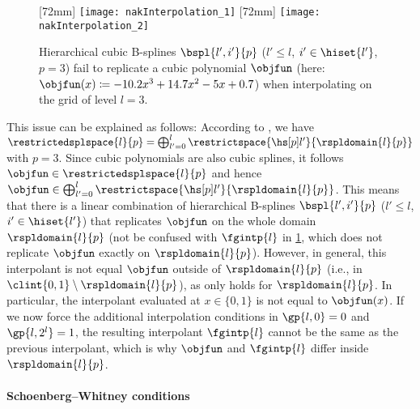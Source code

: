 \begin{figure}
  [72mm]{%
    \texttt{[image: nakInterpolation\_1]}%
  }%
  \hfill%
  [72mm]{%
    \texttt{[image: nakInterpolation\_2]}%
  }%
  \caption[%
    Issues when interpolating with uniform hierarchical B-splines%
  ]{%
    Hierarchical cubic B-splines $\bspl{l',i'}{p}$
    ($l' \le l$, $i' \in \hiset{l'}$, $p = 3$)
    fail to replicate a cubic polynomial $\objfun$
    (here: $\objfun(x) \ceq -10.2 x^3 + 14.7 x^2 - 5x + 0.7$)
    when interpolating on the grid of level $l = 3$.%
  }%
  \label{fig:nakInterpolation}%
\end{figure}

This issue can be explained as follows:
According to ,
we have $\restrictedsplspace{l}{p}
= \bigoplus_{l'=0}^l \restrictspace{\hsbspl{l'}{p}}{\rspldomain{l}{p}}$
with $p = 3$.
Since cubic polynomials are also cubic splines,
it follows $\objfun \in \restrictedsplspace{l}{p}$ and hence
$\objfun \in \bigoplus_{l'=0}^l \restrictspace{\hsbspl{l'}{p}}{\rspldomain{l}{p}}$.
This means that there is a linear combination of hierarchical B-splines
$\bspl{l',i'}{p}$ ($l' \le l$, $i' \in \hiset{l'}$)
that replicates $\objfun$ on the whole domain $\rspldomain{l}{p}$
(not be confused with $\fgintp{l}$ in \cref{fig:nakInterpolation},
which does not replicate $\objfun$ exactly on $\rspldomain{l}{p}$).
However, in general, this interpolant is not equal $\objfun$ outside
of $\rspldomain{l}{p}$ (i.e., in $\clint{0, 1} \setminus \rspldomain{l}{p}$),
as  only holds for $\rspldomain{l}{p}$.
In particular, the interpolant evaluated at $x \in \{0, 1\}$ is not
equal to $\objfun(x)$.
If we now force the additional interpolation conditions in
$\gp{l,0} = 0$ and $\gp{l,2^l} = 1$,
the resulting interpolant $\fgintp{l}$ cannot be the same as the previous
interpolant,
which is why $\objfun$ and $\fgintp{l}$ differ inside $\rspldomain{l}{p}$.

\paragraph{Schoenberg--Whitney conditions}

